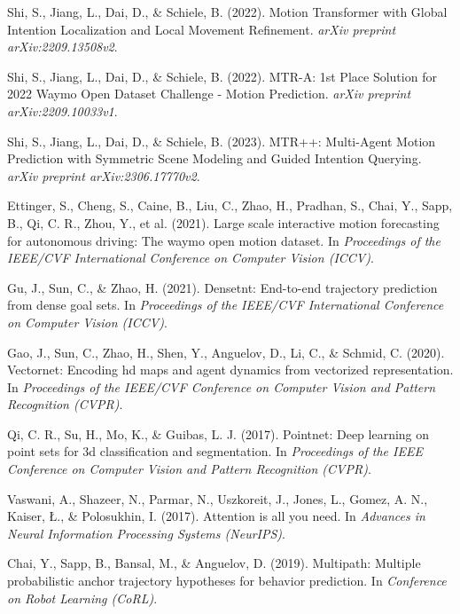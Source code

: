 \begin{thebibliography}{99}

Shi, S., Jiang, L., Dai, D., \& Schiele, B. (2022). Motion Transformer with Global Intention Localization and Local Movement Refinement. \textit{arXiv preprint arXiv:2209.13508v2}.

Shi, S., Jiang, L., Dai, D., \& Schiele, B. (2022). MTR-A: 1st Place Solution for 2022 Waymo Open Dataset Challenge - Motion Prediction. \textit{arXiv preprint arXiv:2209.10033v1}.

Shi, S., Jiang, L., Dai, D., \& Schiele, B. (2023). MTR++: Multi-Agent Motion Prediction with Symmetric Scene Modeling and Guided Intention Querying. \textit{arXiv preprint arXiv:2306.17770v2}.

Ettinger, S., Cheng, S., Caine, B., Liu, C., Zhao, H., Pradhan, S., Chai, Y., Sapp, B., Qi, C. R., Zhou, Y., et al. (2021). Large scale interactive motion forecasting for autonomous driving: The waymo open motion dataset. In \textit{Proceedings of the IEEE/CVF International Conference on Computer Vision (ICCV)}.

Gu, J., Sun, C., \& Zhao, H. (2021). Densetnt: End-to-end trajectory prediction from dense goal sets. In \textit{Proceedings of the IEEE/CVF International Conference on Computer Vision (ICCV)}.

Gao, J., Sun, C., Zhao, H., Shen, Y., Anguelov, D., Li, C., \& Schmid, C. (2020). Vectornet: Encoding hd maps and agent dynamics from vectorized representation. In \textit{Proceedings of the IEEE/CVF Conference on Computer Vision and Pattern Recognition (CVPR)}.

Qi, C. R., Su, H., Mo, K., \& Guibas, L. J. (2017). Pointnet: Deep learning on point sets for 3d classification and segmentation. In \textit{Proceedings of the IEEE Conference on Computer Vision and Pattern Recognition (CVPR)}.

Vaswani, A., Shazeer, N., Parmar, N., Uszkoreit, J., Jones, L., Gomez, A. N., Kaiser, Ł., \& Polosukhin, I. (2017). Attention is all you need. In \textit{Advances in Neural Information Processing Systems (NeurIPS)}.

Chai, Y., Sapp, B., Bansal, M., \& Anguelov, D. (2019). Multipath: Multiple probabilistic anchor trajectory hypotheses for behavior prediction. In \textit{Conference on Robot Learning (CoRL)}.


\end{thebibliography}
